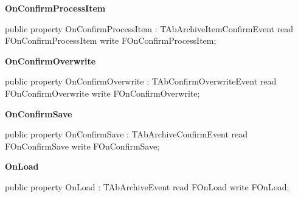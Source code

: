 \documentclass{report}
\newif\ifpdf
\begin{document}
\begin{list}{}
\begin{flushleft}
\ifpdf
\end{flushleft}
\fi


\par  \label{AbArcTyp.TAbArchive-OnConfirmProcessItem}
\item[\textbf{OnConfirmProcessItem}\hfill]
\ifpdf
\begin{flushleft}
\fi
\begin{ttfamily}
public property OnConfirmProcessItem : TAbArchiveItemConfirmEvent
      read FOnConfirmProcessItem
      write FOnConfirmProcessItem;\end{ttfamily}

\ifpdf
\end{flushleft}
\fi


\par  \label{AbArcTyp.TAbArchive-OnConfirmOverwrite}
\item[\textbf{OnConfirmOverwrite}\hfill]
\ifpdf
\begin{flushleft}
\fi
\begin{ttfamily}
public property OnConfirmOverwrite : TAbConfirmOverwriteEvent
      read FOnConfirmOverwrite
      write FOnConfirmOverwrite;\end{ttfamily}

\ifpdf
\end{flushleft}
\fi


\par  \label{AbArcTyp.TAbArchive-OnConfirmSave}
\item[\textbf{OnConfirmSave}\hfill]
\ifpdf
\begin{flushleft}
\fi
\begin{ttfamily}
public property OnConfirmSave : TAbArchiveConfirmEvent
      read FOnConfirmSave
      write FOnConfirmSave;\end{ttfamily}

\ifpdf
\end{flushleft}
\fi


\par  \label{AbArcTyp.TAbArchive-OnLoad}
\item[\textbf{OnLoad}\hfill]
\ifpdf
\begin{flushleft}
\fi
\begin{ttfamily}
public property OnLoad : TAbArchiveEvent
      read FOnLoad
      write FOnLoad;\end{ttfamily}

\ifpdf
\end{flushleft}
\fi



\end{list}
\end{document}
